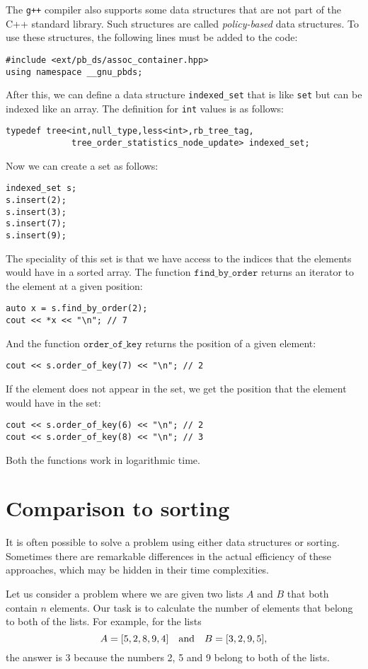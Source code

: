 The \texttt{g++} compiler also supports
some data structures that are not part
of the C++ standard library.
Such structures are called \emph{policy-based}
data structures.
To use these structures, the following lines
must be added to the code:
\begin{lstlisting}
#include <ext/pb_ds/assoc_container.hpp>
using namespace __gnu_pbds; 
\end{lstlisting}
After this, we can define a data structure \texttt{indexed\_set} that
is like \texttt{set} but can be indexed like an array.
The definition for \texttt{int} values is as follows:
\begin{lstlisting}
typedef tree<int,null_type,less<int>,rb_tree_tag,
             tree_order_statistics_node_update> indexed_set; 
\end{lstlisting}
Now we can create a set as follows:
\begin{lstlisting}
indexed_set s;
s.insert(2);
s.insert(3);
s.insert(7);
s.insert(9);
\end{lstlisting}
The speciality of this set is that we have access to
the indices that the elements would have in a sorted array.
The function $\texttt{find\_by\_order}$ returns
an iterator to the element at a given position:
\begin{lstlisting}
auto x = s.find_by_order(2);
cout << *x << "\n"; // 7
\end{lstlisting}
And the function $\texttt{order\_of\_key}$
returns the position of a given element:
\begin{lstlisting}
cout << s.order_of_key(7) << "\n"; // 2
\end{lstlisting}
If the element does not appear in the set,
we get the position that the element would have
in the set:
\begin{lstlisting}
cout << s.order_of_key(6) << "\n"; // 2
cout << s.order_of_key(8) << "\n"; // 3
\end{lstlisting}
Both the functions work in logarithmic time.

\section{Comparison to sorting}

It is often possible to solve a problem
using either data structures or sorting.
Sometimes there are remarkable differences
in the actual efficiency of these approaches,
which may be hidden in their time complexities.

Let us consider a problem where
we are given two lists $A$ and $B$
that both contain $n$ elements.
Our task is to calculate the number of elements
that belong to both of the lists.
For example, for the lists
\[A = [5,2,8,9,4] \hspace{10px} \textrm{and} \hspace{10px} B = [3,2,9,5],\]
the answer is 3 because the numbers 2, 5
and 9 belong to both of the lists.

